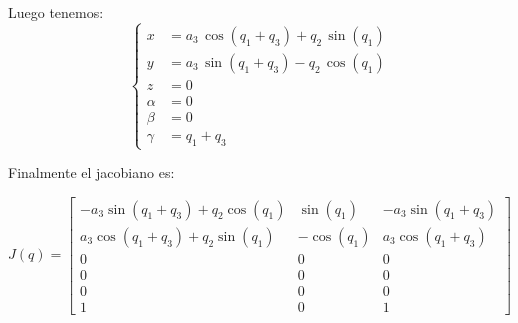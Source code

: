 \documentclass[a4paper,12pt]{article}
\begin{document}
Luego tenemos:
\begin{equation}
    \left\{
    \begin{aligned}
    x &= a_{3}\,\cos\left(q_{1}+q_{3}\right)+q_{2}\,\sin\left(q_{1}\right)\\
    y &= a_{3}\,\sin\left(q_{1}+q_{3}\right)-q_{2}\,\cos\left(q_{1}\right)\\
    z &= 0 \\
    \alpha &= 0 \\
    \beta &= 0 \\
    \gamma &= q_1 + q_3
    \end{aligned}
    \right.
    \label{directa RRR}
\end{equation}

Finalmente el jacobiano es:

\begin{equation}
    J(q) = 
    \begin{bmatrix}
        -a_3\sin(q_1 + q_3) + q_2\cos(q_1) & \sin(q_1)  & -a_3\sin(q_1 + q_3)\\
        a_3\cos(q_1 + q_3)  + q_2\sin(q_1) & -\cos(q_1) & a_3\cos(q_1 + q_3)\\
        0 & 0 & 0\\
        0 & 0 & 0\\
        0 & 0 & 0\\
        1 & 0 & 1
    \end{bmatrix}
\end{equation}




\end{document}

